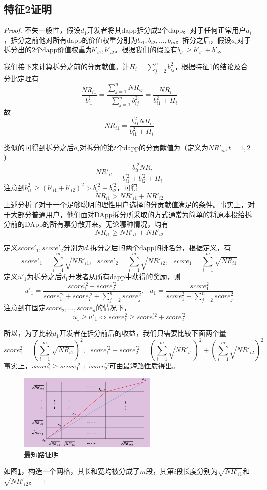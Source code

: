 \subsection{特征2证明}
\begin{proof}
	 不失一般性，假设$d_1$开发者将其dapp拆分成2个dapp。对于任何正常用户$a_i$，拆分之前他对所有dapp的价值权重分别为$b_{i1},b_{i2},...,b_{in}$。拆分之后，假设$a_i$对于拆分出的$2$个dapp价值权重为$b'_{i1},b'_{i2}$。根据我们的假设有$b_{i1} \geq b'_{i1}+b'_{i2}$
	 
	 我们接下来计算拆分之前的分贡献值。计$H_i = \sum_{j=2}^n b_{ij}^2$，根据特征1的结论及合分比定理有
	 $$\frac{NR_{i1}}{b_{i1}^2} = \frac{\sum_{j=1}^n NR_{ij}}{\sum_{j=1}^n b_{ij}^2} = \frac{NR_i}{b_{i1}^2+H_i}$$ 
	 故
	 $$NR_{i1}=\frac{b_{i1}^2NR_i}{b_{i1}^2+H_i}$$
	 
     类似的可得到拆分之后$a_i$对拆分的第$t$个dapp的分贡献值为（定义为$NR'_{it},t=1,2$）
	 $$NR'_{it} =  \frac{b_{it}^{'2}NR_i}{b_{i1}^{'2}+b_{i2}^{'2}+H_i}$$
	 注意到$b_{i1}^2 \geq (b‘_{i1}+b’_{i2})^2 >b_{i1}^{'2}+b_{i2}^{'2}$，可得
	 $$NR_{i1} > NR'_{i1}+NR'_{i2}$$
	 上述分析了对于一个足够聪明的理性用户选择的分贡献值满足的条件。事实上，对于大部分普通用户，他们面对DApp拆分所采取的方式通常为简单的将原本投给拆分前的DApp的所有票分散开来。无论哪种情况，均有
	 	$$NR_{i1} \geq NR'_{i1}+NR'_{i2}$$
	 
	 定义$score'_1,score'_2$分别为$d_1$拆分之后的两个dapp的排名分，根据定义，有
	 $$score'_1 =  \sum_{i=1}^m \sqrt{NR'_{i1}},~~~score'_2 =  \sum_{i=1}^m \sqrt{NR'_{i2}},~~~score_1 = \sum_{i=1}^m \sqrt{NR_{i1}}$$
	 定义$u'_1$为拆分之后$d_1$开发者从所有dapp中获得的奖励，则
	 $$u'_1=\frac{score_1^{'2}+score_2^{'2}}{score_1^{'2}+score_2^{'2}+\sum_{j=2}^n score_j^2},~~~u_1=\frac{score^2_1}{score_1^2+\sum_{j=2}^n score_j^2}$$
	 注意到在固定$score_2,...,score_n$的情况下，
	 $$ u_1 \geq u'_1 \Leftrightarrow score_1^2 \geq score_1^{'2}+score_2^{'2}$$
	 
	 所以，为了比较$d_1$开发者在拆分前后的收益，我们只需要比较下面两个量
	 $$score_1^2 = (\sum_{i=1}^m \sqrt{NR_{i1}})^2,~~~score_1^{'2}+score_2^{'2}=  (\sum_{i=1}^m \sqrt{NR'_{i1}})^2+(\sum_{i=1}^m \sqrt{NR'_{i2}})^2$$
	 事实上，$score_1^2 \geq score_1^{'2}+score_2^{'2}$可由最短路性质得出。
	 \begin{figure}
	 	\centering
	 	 \includegraphics[width = 0.6\textwidth]{../common/m1.png}
	 	\caption{最短路证明 \label{fig:path}}
	 \end{figure}
	 如图\ref{fig:path}，构造一个网格，其长和宽均被分成了$m$段，其第$i$段长度分别为$\sqrt{NR'_{i1}}$和$\sqrt{NR'_{i2}}$。
	 

\end{proof}
